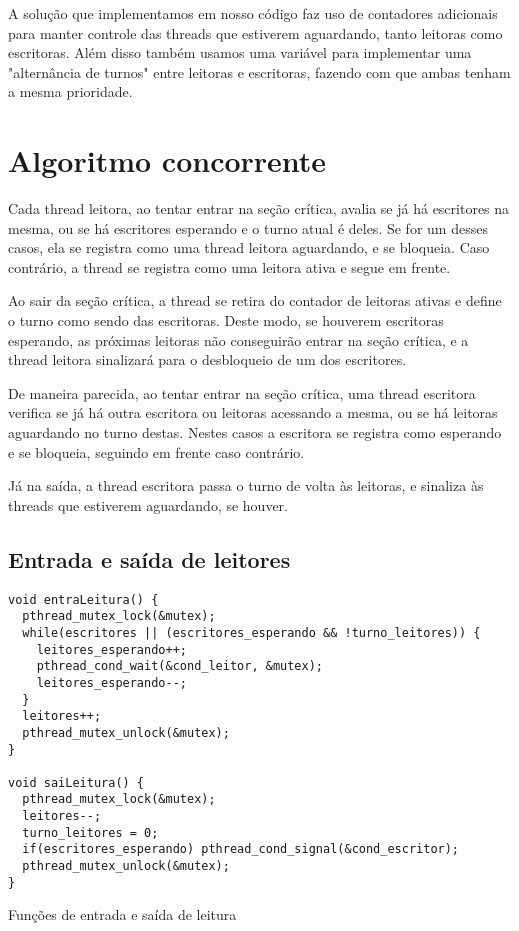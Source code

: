 \documentclass[11pt]{article}
\begin{document}
A solução que implementamos em nosso código faz uso de contadores adicionais para
manter controle das threads que estiverem aguardando, tanto leitoras como escritoras.
Além disso também usamos uma variável para implementar uma "alternância de
turnos" entre leitoras e escritoras, fazendo com que ambas tenham a mesma prioridade.

\section{Algoritmo concorrente}
\label{sec:org8166111}
Cada thread leitora, ao tentar entrar na seção crítica, avalia se já há escritores na
mesma, ou se há escritores esperando e o turno atual é deles.
Se for um desses casos, ela se registra como uma thread leitora aguardando, e se bloqueia.
Caso contrário, a thread se registra como uma leitora ativa e segue em frente.

Ao sair da seção crítica, a thread se retira do contador de leitoras ativas e define o
turno como sendo das escritoras. Deste modo, se houverem escritoras esperando, as próximas
leitoras não conseguirão entrar na seção crítica, e a thread leitora sinalizará para o
desbloqueio de um dos escritores.

De maneira parecida, ao tentar entrar na seção crítica, uma thread escritora verifica
se já há outra escritora ou leitoras acessando a mesma, ou se há leitoras aguardando no
turno destas. Nestes casos a escritora se registra como esperando e se bloqueia, seguindo
em frente caso contrário.

Já na saída, a thread escritora passa o turno de volta às leitoras, e sinaliza às threads
que estiverem aguardando, se houver.

\subsection{Entrada e saída de leitores}
\label{sec:org7528baf}
\begin{listing}[htbp]
\begin{verbatim}
void entraLeitura() {
  pthread_mutex_lock(&mutex);
  while(escritores || (escritores_esperando && !turno_leitores)) {
    leitores_esperando++;
    pthread_cond_wait(&cond_leitor, &mutex);
    leitores_esperando--;
  }
  leitores++;
  pthread_mutex_unlock(&mutex);
}

void saiLeitura() {
  pthread_mutex_lock(&mutex);
  leitores--;
  turno_leitores = 0;
  if(escritores_esperando) pthread_cond_signal(&cond_escritor);  
  pthread_mutex_unlock(&mutex);
}
\end{verbatim}
\caption{\label{Leitores}
Funções de entrada e saída de leitura}
\end{listing}
\end{document}
